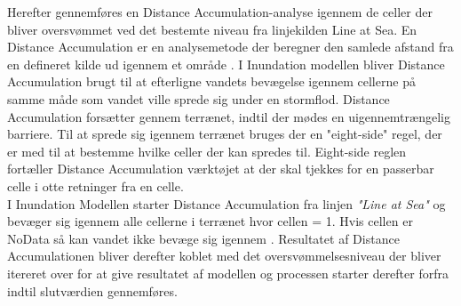 Herefter gennemføres en Distance Accumulation-analyse igennem de celler der bliver oversvømmet ved det bestemte niveau fra linjekilden Line at Sea. En Distance Accumulation er en analysemetode der beregner den samlede afstand fra en defineret kilde ud igennem et område \citep{esri_how_nodate}. I Inundation modellen bliver Distance Accumulation brugt til at efterligne vandets bevægelse igennem cellerne på samme måde som vandet ville sprede sig under en stormflod. Distance Accumulation forsætter gennem terrænet, indtil der mødes en uigennemtrængelig barriere. Til at sprede sig igennem terrænet bruges der en "eight-side" \hspace{0.2cm}regel, der er med til at bestemme hvilke celler der kan spredes til. Eight-side reglen fortæller Distance Accumulation værktøjet at der skal tjekkes for en passerbar celle i otte retninger fra en celle.\\

I Inundation Modellen starter Distance Accumulation fra linjen \textit{"Line at Sea"} og bevæger sig igennem alle cellerne i terrænet hvor cellen = 1. Hvis cellen er NoData så kan vandet ikke bevæge sig igennem \citep{balstrom_kirby_inundation}. Resultatet af Distance Accumulationen bliver derefter koblet med det oversvømmelsesniveau der bliver itereret over for at give resultatet af modellen og processen starter derefter forfra indtil slutværdien gennemføres.  
